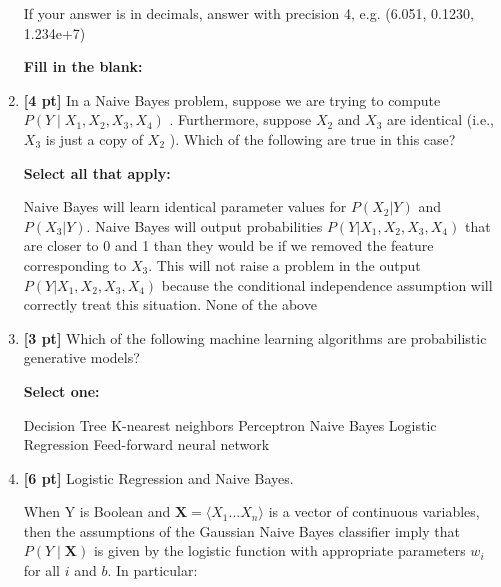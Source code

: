 \documentclass[12pt,addpoints,answers]{exam}
\newcommand{\Xv}{\mathbf{X}}
\begin{document}
\begin{enumerate}
    If your answer is in decimals, answer with precision 4, e.g. (6.051, 0.1230, 1.234e+7)

    \textbf{Fill in the blank:}
    
    \begin{tcolorbox}[fit,height=1cm, width=4cm, blank, borderline={1pt}{-2pt},nobeforeafter]
    
    \end{tcolorbox}
    
    
    \item \textbf{[4 pt]} In a Naive Bayes problem, suppose we are trying to compute $P(Y\mid X_1,X_2,X_3,X_4)$ .  Furthermore, suppose  $X_2$  and  $X_3$  are identical (i.e., $X_3$  is just a copy of $X_2$ ).  Which of the following are true in this case?

    \textbf{Select all that apply:}
    {\checkboxchar{$\Box$} \checkedchar{$\blacksquare$}
        \begin{checkboxes}
        \choice Naive Bayes will learn identical parameter values for $P(X_2|Y)$ and $P(X_3|Y)$.
        \choice Naive Bayes will output probabilities $P(Y|X_1,X_2,X_3,X_4)$ that are closer to 0 and 1 than they would be if we removed the feature corresponding to $X_3$.
        \choice This will not raise a problem in the output  $P(Y|X_1,X_2,X_3,X_4)$ because the conditional independence assumption will correctly treat this situation.
        \choice None of the above
    \end{checkboxes}
    }
    
    \item \textbf{[3 pt]} Which of the following machine learning algorithms are probabilistic generative models?

    \textbf{Select one:}
    \begin{checkboxes}
        \choice Decision Tree
        \choice K-nearest neighbors
        \choice Perceptron
        \choice Naive Bayes
        \choice Logistic Regression
        \choice Feed-forward neural network
    \end{checkboxes}
    

\clearpage

\item \textbf{[6 pt]} Logistic Regression and Naive Bayes. 

When Y is Boolean and $\Xv = \langle{X_{1}...X_{n}}\rangle$ is a vector of continuous variables, then the assumptions of the Gaussian Naive Bayes classifier imply that $P(Y \mid \Xv)$ is given by the logistic function with
appropriate parameters $w_i$ for all $i$ and $b$. In particular:


\end{enumerate}
\end{document}
